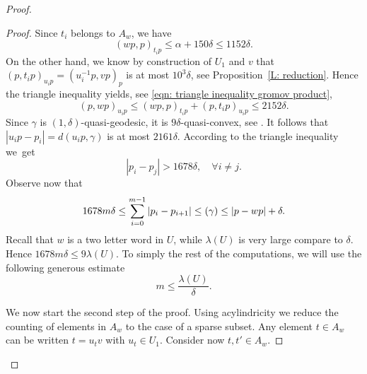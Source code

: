 \documentclass[JEP,XML,SOM,Unicode, NoEqCountersInSection,published]{cedram}
\newcommand{\NoChangel}[1]{%
\expandafter\let\csname old\string#1\endcsname=#1
\let#1=\relax
\newcommand{#1}{\mathcode`l="716C\csname old\string#1\endcsname\mathcode`l="7160 }%
}
\theoremstyle{plain}
\theoremstyle{definition}
\DeclareMathOperator{\length}{length}\NoChangel{\length}
\begin{document}
\begin{proof}
\begin{proof}
Since $t_i$ belongs to $A_w$, we have
\begin{equation*}
(wp,p)_{t_ip} \leq \alpha + 150\delta \leq 1152\delta.
\end{equation*}
On the other hand, we know by construction of $U_1$ and $v$ that $(p,t_ip)_{u_ip} = (u_i^{-1}p,vp)_p$ is at most $10^3\delta$, see Proposition~\ref{L: reduction}.
Hence the triangle inequality yields, see \eqref{eqn: triangle inequality gromov product},
\begin{equation*}
(p,wp)_{u_ip} \leq (wp,p)_{t_ip} + (p,t_ip)_{u_ip} \leq 2152\delta.
\end{equation*}
Since $\gamma$ is $(1, \delta)$-quasi-geodesic, it is $9\delta$-quasi-convex, see \cite[Cor.\,2.7(2)]{coulon_geometry_2014}.
It follows that $|u_ip - p_i| = d(u_ip,\gamma)$ is at most $2161\delta$.
According to the triangle inequality we~get
\begin{equation*}
|p_i - p_j| > 1678\delta,\quad \forall i \neq j.
\end{equation*}
Observe now that
\begin{equation*}
1678m\delta \leq \sum_{i = 0}^{m-1} |p_i - p_{i+1}|
\leq \length(\gamma) \leq |p - wp| + \delta.
\end{equation*}
Recall that $w$ is a two letter word in $U$, while $\lambda(U)$ is very large compare to $\delta$.
Hence $1678m\delta \leq 9\lambda(U)$.
To simply the rest of the computations, we will use the following generous estimate
\begin{equation*}
m \leq \frac{ \lambda(U)}\delta.
\end{equation*}

We now start the second step of the proof.
Using acylindricity we reduce the counting of elements in $A_w$ to the case of a sparse subset.
Any element $t \in A_w$ can be written $t = u_tv$ with $u_t \in U_1$.
Consider now $t,t' \in A_w$.


\end{proof}
\end{proof}
\end{document}
